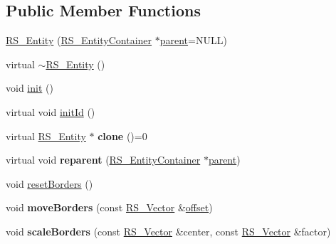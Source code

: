 \subsection*{Public Member Functions}
\begin{DoxyCompactItemize}
\item 
\hyperlink{classRS__Entity_ad6f5b82c91b5f64a46379429f473c61b}{R\-S\-\_\-\-Entity} (\hyperlink{classRS__EntityContainer}{R\-S\-\_\-\-Entity\-Container} $\ast$\hyperlink{classRS__Entity_a80358a8d2fc6739a516a278dc500b49f}{parent}=N\-U\-L\-L)
\item 
virtual \hyperlink{classRS__Entity_aed43c14f88ea80f26fd230d31e81d0df}{$\sim$\-R\-S\-\_\-\-Entity} ()
\item 
void \hyperlink{classRS__Entity_ae1949b4574b0b5174c31533e9ef7ae91}{init} ()
\item 
virtual void \hyperlink{classRS__Entity_a13caaa93676ec1fca0d38b65d90b1879}{init\-Id} ()
\item 
\hypertarget{classRS__Entity_a2c8b66a597267e25bb1daf49f9e19d80}{virtual \hyperlink{classRS__Entity}{R\-S\-\_\-\-Entity} $\ast$ {\bfseries clone} ()=0}\label{classRS__Entity_a2c8b66a597267e25bb1daf49f9e19d80}

\item 
\hypertarget{classRS__Entity_a01bf073515b5e3892ad9d79b00bb073f}{virtual void {\bfseries reparent} (\hyperlink{classRS__EntityContainer}{R\-S\-\_\-\-Entity\-Container} $\ast$\hyperlink{classRS__Entity_a80358a8d2fc6739a516a278dc500b49f}{parent})}\label{classRS__Entity_a01bf073515b5e3892ad9d79b00bb073f}

\item 
void \hyperlink{classRS__Entity_a5816e88af4f089eae4b956644b26f9ea}{reset\-Borders} ()
\item 
\hypertarget{classRS__Entity_a2f348d1c5aeea9176267498f5f939536}{void {\bfseries move\-Borders} (const \hyperlink{classRS__Vector}{R\-S\-\_\-\-Vector} \&\hyperlink{classRS__Entity_aa296d21b9aac99161d386ce2f60f0fea}{offset})}\label{classRS__Entity_a2f348d1c5aeea9176267498f5f939536}

\item 
\hypertarget{classRS__Entity_ae59de8fd32cc3f4f522e8606f8e3bcf1}{void {\bfseries scale\-Borders} (const \hyperlink{classRS__Vector}{R\-S\-\_\-\-Vector} \&center, const \hyperlink{classRS__Vector}{R\-S\-\_\-\-Vector} \&factor)}\label{classRS__Entity_ae59de8fd32cc3f4f522e8606f8e3bcf1}


\end{DoxyCompactItemize}

